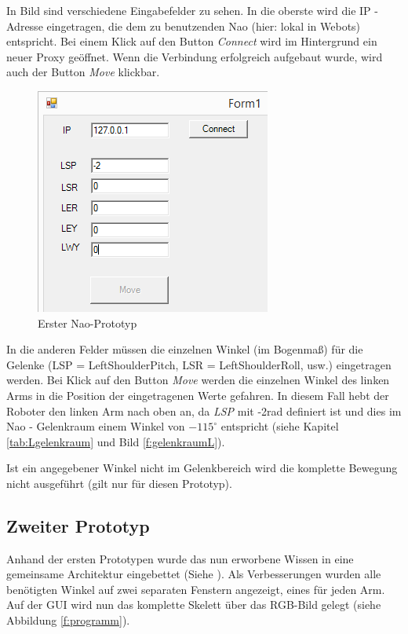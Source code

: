 In Bild  sind verschiedene Eingabefelder zu sehen. In die oberste wird die IP - Adresse eingetragen, die dem zu benutzenden Nao (hier: lokal in Webots) entspricht. Bei einem Klick auf den Button \textit{Connect} wird im Hintergrund ein neuer Proxy geöffnet. Wenn die Verbindung erfolgreich aufgebaut wurde, wird auch der Button \textit{Move} klickbar.
\begin{figure}[H]						
	\centering							
	\includegraphics[scale=0.8]{Bilder/nao_prototyp1.PNG}
	\caption{Erster Nao-Prototyp}						
	\label{f:nao_prototyp1}						
\end{figure}
In die anderen Felder müssen die einzelnen Winkel (im Bogenmaß) für die Gelenke (LSP = LeftShoulderPitch, LSR = LeftShoulderRoll, usw.) eingetragen werden. Bei Klick auf den Button \textit{Move} werden die einzelnen Winkel des linken Arms in die Position der eingetragenen Werte gefahren. In diesem Fall hebt der Roboter den linken Arm nach oben an, da \textit{LSP} mit -2rad definiert ist und dies im Nao - Gelenkraum einem Winkel von $-115^{\circ}$ entspricht (siehe Kapitel \ref{tab:Lgelenkraum} und Bild \ref{f:gelenkraumL}). 

Ist ein angegebener Winkel nicht im Gelenkbereich wird die komplette Bewegung nicht ausgeführt (gilt nur für diesen Prototyp).

\subsection{Zweiter Prototyp}
Anhand der ersten Prototypen wurde das nun erworbene Wissen in eine gemeinsame Architektur eingebettet (Siehe ). Als Verbesserungen wurden alle benötigten Winkel auf zwei separaten Fenstern angezeigt, eines für jeden Arm. Auf der GUI wird nun das komplette Skelett über das RGB-Bild gelegt (siehe Abbildung \ref{f:programm}).


